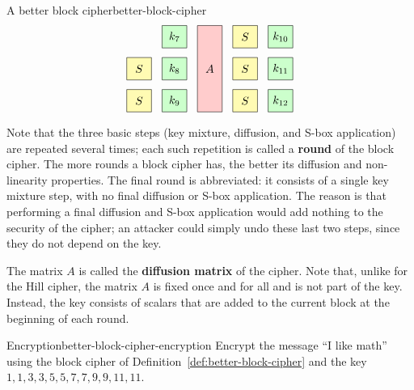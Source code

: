 \begin{definition}{A better block cipher}{better-block-cipher}
\begin{equation*}
\begin{tikzpicture}[xscale=1.1,
      a/.style={fill=red!20},
      s/.style={fill=yellow!30},
      k/.style={fill=green!20}]
      \draw[s] (6,1) +(-0.35,-0.35) rectangle node{$S$} +(0.35,0.35);
      \draw[s] (6,0) +(-0.35,-0.35) rectangle node{$S$} +(0.35,0.35);
      \draw[k] (7,2) +(-0.35,-0.35) rectangle node{$k_{7}$} +(0.35,0.35);
      \draw[k] (7,1) +(-0.35,-0.35) rectangle node{$k_{8}$} +(0.35,0.35);
      \draw[k] (7,0) +(-0.35,-0.35) rectangle node{$k_{9}$} +(0.35,0.35);
      \draw[a] (8,0) +(-0.35,-0.35) rectangle node{$A$} +(0.35,2.35);
      \draw[s] (9,2) +(-0.35,-0.35) rectangle node{$S$} +(0.35,0.35);
      \draw[s] (9,1) +(-0.35,-0.35) rectangle node{$S$} +(0.35,0.35);
      \draw[s] (9,0) +(-0.35,-0.35) rectangle node{$S$} +(0.35,0.35);
      \draw[k] (10,2) +(-0.35,-0.35) rectangle node{$k_{10}$} +(0.35,0.35);
      \draw[k] (10,1) +(-0.35,-0.35) rectangle node{$k_{11}$} +(0.35,0.35);
      \draw[k] (10,0) +(-0.35,-0.35) rectangle node{$k_{12}$} +(0.35,0.35);
  \end{tikzpicture}
\end{equation*}
\end{definition}

Note that the three basic steps (key mixture, diffusion, and S-box
application) are repeated several times; each such repetition is
called a \textbf{round} of the block
cipher.  The more rounds a block cipher has, the better its diffusion
and non-linearity properties. The final round is abbreviated: it
consists of a single key mixture step, with no final diffusion or
S-box application. The reason is that performing a final diffusion and
S-box application would add nothing to the security of the cipher; an
attacker could simply undo these last two steps, since they do not
depend on the key.

The matrix $A$ is called the \textbf{diffusion matrix}%
%
 of the cipher. Note that, unlike for
the Hill cipher, the matrix $A$ is fixed once and for all and is not
part of the key. Instead, the key consists of scalars that are added
to the current block at the beginning of each round.

\begin{example}{Encryption}{better-block-cipher-encryption}
  Encrypt the message ``I like math'' using the block cipher of
  Definition~\ref{def:better-block-cipher} and the key $1,1,3,3,5,5,7,7,9,9,11,11$.
\end{example}

